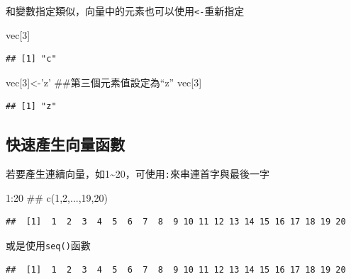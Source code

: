 \documentclass[]{book}
\newenvironment{Shaded}{\begin{snugshade}}{\end{snugshade}}
\newcommand{\KeywordTok}[1]{\textcolor[rgb]{0.13,0.29,0.53}{\textbf{{#1}}}}
\newcommand{\DataTypeTok}[1]{\textcolor[rgb]{0.13,0.29,0.53}{{#1}}}
\newcommand{\DecValTok}[1]{\textcolor[rgb]{0.00,0.00,0.81}{{#1}}}
\newcommand{\StringTok}[1]{\textcolor[rgb]{0.31,0.60,0.02}{{#1}}}
\newcommand{\NormalTok}[1]{{#1}}
\theoremstyle{definition}
\theoremstyle{definition}
\theoremstyle{remark}
\begin{document}
和變數指定類似，向量中的元素也可以使用\texttt{\textless{}-}重新指定

\begin{Shaded}
\begin{Highlighting}[]
\NormalTok{vec[}\DecValTok{3}\NormalTok{]}
\end{Highlighting}
\end{Shaded}

\begin{verbatim}
## [1] "c"
\end{verbatim}

\begin{Shaded}
\begin{Highlighting}[]
\NormalTok{vec[}\DecValTok{3}\NormalTok{]<-}\StringTok{'z'} \NormalTok{##第三個元素值設定為“z”}
\NormalTok{vec[}\DecValTok{3}\NormalTok{] }
\end{Highlighting}
\end{Shaded}

\begin{verbatim}
## [1] "z"
\end{verbatim}

\subsection{快速產生向量函數}

若要產生連續向量，如1\textasciitilde{}20，可使用\texttt{:}來串連首字與最後一字

\begin{Shaded}
\begin{Highlighting}[]
\DecValTok{1}\NormalTok{:}\DecValTok{20} \NormalTok{## c(1,2,...,19,20)}
\end{Highlighting}
\end{Shaded}

\begin{verbatim}
##  [1]  1  2  3  4  5  6  7  8  9 10 11 12 13 14 15 16 17 18 19 20
\end{verbatim}

或是使用\texttt{seq()}函數

\begin{Shaded}
\end{Shaded}

\begin{verbatim}
##  [1]  1  2  3  4  5  6  7  8  9 10 11 12 13 14 15 16 17 18 19 20
\end{verbatim}
\end{document}
